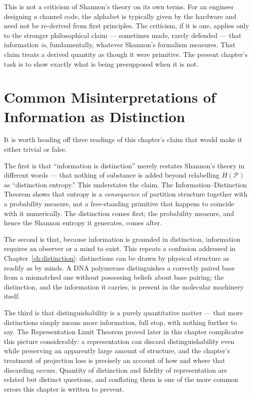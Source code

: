 \documentclass[12pt,twoside,openright]{book}
\newcommand{\partition}{\mathcal{P}}
\begin{document}
This is not a criticism of Shannon's theory on its own terms.
For an engineer designing a channel code, the alphabet is
typically given by the hardware and need not be re-derived from
first principles. The criticism, if it is one, applies only to
the stronger philosophical claim --- sometimes made, rarely
defended --- that information \emph{is}, fundamentally,
whatever Shannon's formalism measures. That claim treats a
derived quantity as though it were primitive. The present
chapter's task is to show exactly what is being presupposed
when it is not.

\section{Common Misinterpretations of Information as
  Distinction}
\label{sec:ch2-misinterpretations}

It is worth heading off three readings of this chapter's claim
that would make it either trivial or false.

The first is that ``information is distinction'' merely
restates Shannon's theory in different words --- that nothing
of substance is added beyond relabelling $H(\partition)$ as
``distinction entropy.'' This understates the claim. The
Information--Distinction Theorem shows that entropy is a
\emph{consequence} of partition structure together with a
probability measure, not a free-standing primitive that happens
to coincide with it numerically. The distinction comes first;
the probability measure, and hence the Shannon entropy it
generates, comes after.

The second is that, because information is grounded in
distinction, information requires an observer or a mind to
exist. This repeats a confusion addressed in
Chapter~\ref{ch:distinction}: distinctions can be drawn by
physical structure as readily as by minds. A DNA polymerase
distinguishes a correctly paired base from a mismatched one
without possessing beliefs about base pairing; the distinction,
and the information it carries, is present in the molecular
machinery itself.

The third is that distinguishability is a purely quantitative
matter --- that more distinctions simply means more
information, full stop, with nothing further to say. The
Representation Limit Theorem proved later in this chapter
complicates this picture considerably: a representation can
discard distinguishability even while preserving an apparently
large amount of structure, and the chapter's treatment of
projection loss is precisely an account of how and where that
discarding occurs. Quantity of distinction and fidelity of
representation are related but distinct questions, and
conflating them is one of the more common errors this chapter
is written to prevent.
\end{document}
